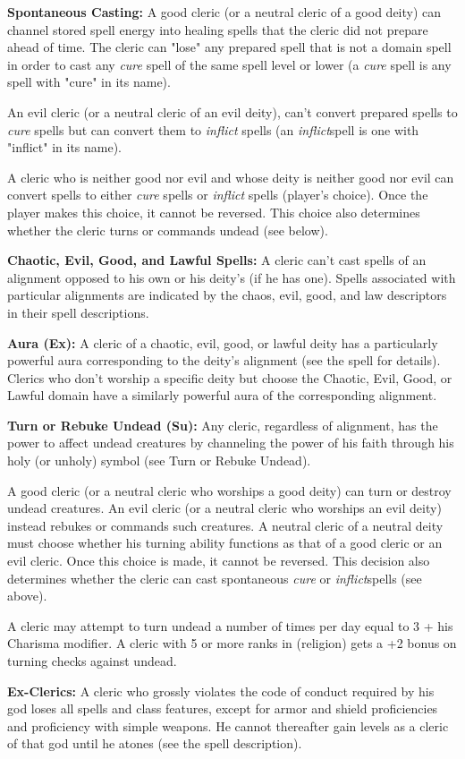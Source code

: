\textbf{Spontaneous Casting:} A good cleric (or a neutral cleric of a good deity) can channel stored spell energy into healing spells that the cleric did not prepare ahead of time. The cleric can "lose" any prepared spell that is not a domain spell in order to cast any \textit{cure} spell of the same spell level or lower (a \textit{cure} spell is any spell with "cure" in its name). 

An evil cleric (or a neutral cleric of an evil deity), can't convert prepared spells to \textit{cure} spells but can convert them to \textit{inflict} spells (an \textit{inflict}spell is one with "inflict" in its name).

A cleric who is neither good nor evil and whose deity is neither good nor evil can convert spells to either \textit{cure} spells or \textit{inflict} spells (player's choice). Once the player makes this choice, it cannot be reversed. This choice also determines whether the cleric turns or commands undead (see below).

\textbf{Chaotic, Evil, Good, and Lawful Spells:} A cleric can't cast spells of an alignment opposed to his own or his deity's (if he has one). Spells associated with particular alignments are indicated by the chaos, evil, good, and law descriptors in their spell descriptions.

\textbf{Aura (Ex):} A cleric of a chaotic, evil, good, or lawful deity has a particularly powerful aura corresponding to the deity's alignment (see the  spell for details). Clerics who don't worship a specific deity but choose the Chaotic, Evil, Good, or Lawful domain have a similarly powerful aura of the corresponding alignment.

\textbf{Turn or Rebuke Undead (Su):} Any cleric, regardless of alignment, has the power to affect undead creatures by channeling the power of his faith through his holy (or unholy) symbol (see Turn or Rebuke Undead).

A good cleric (or a neutral cleric who worships a good deity) can turn or destroy undead creatures. An evil cleric (or a neutral cleric who worships an evil deity) instead rebukes or commands such creatures. A neutral cleric of a neutral deity must choose whether his turning ability functions as that of a good cleric or an evil cleric. Once this choice is made, it cannot be reversed. This decision also determines whether the cleric can cast spontaneous \textit{cure} or \textit{inflict}spells (see above).

A cleric may attempt to turn undead a number of times per day equal to 3 + his Charisma modifier. A cleric with 5 or more ranks in  (religion) gets a +2 bonus on turning checks against undead.

\textbf{Ex-Clerics:} A cleric who grossly violates the code of conduct required by his god loses all spells and class features, except for armor and shield proficiencies and proficiency with simple weapons. He cannot thereafter gain levels as a cleric of that god until he atones (see the  spell description).